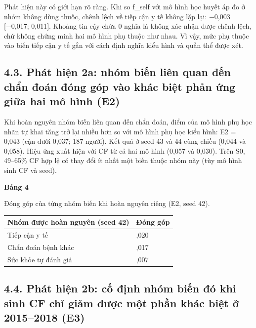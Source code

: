\documentclass[9pt,a4paper]{extarticle}
\newcommand{\tabcap}[2]{{\footnotesize\textbf{Bảng #1}\par\vspace{1pt}#2\par}\vspace{3pt}\scriptsize}
\newcommand{\tabnote}[1]{\par\vspace{2pt}{\scriptsize\raggedright #1\par}}
\begin{document}
Phát hiện này có giới hạn rõ ràng. Khi so f\_self với mô hình học huyết
áp đo ở nhóm không dùng thuốc, chênh lệch về tiếp cận y tế không lặp
lại: −0,003 {[}−0,017; 0,011{]}. Khoảng tin cậy chứa 0 nghĩa là không
xác nhận được chênh lệch, chứ không chứng minh hai mô hình phụ thuộc như
nhau. Vì vậy, mức phụ thuộc vào biến tiếp cận y tế gắn với cách định
nghĩa kiểu hình và quần thể được xét.

\subsection{4.3. Phát hiện 2a: nhóm biến liên quan đến chẩn đoán đóng
góp vào khác biệt phản ứng giữa hai mô hình (E2)}

Khi hoàn nguyên nhóm biến liên quan đến chẩn đoán, điểm của mô hình phụ
học nhãn tự khai tăng trở lại nhiều hơn so với mô hình phụ học kiểu
hình: E2 = 0,043 (cận dưới 0,037; 187 người). Kết quả ở seed 43 và 44
cùng chiều (0,044 và 0,058). Hiệu ứng xuất hiện với CF từ cả hai mô hình
(0,057 và 0,030). Trên S0, 49--65\% CF hợp lệ có thay đổi ít nhất một
biến thuộc nhóm này (tùy mô hình sinh CF và seed).

\begin{table}[!t]
\tabcap{4}{Đóng góp của từng nhóm biến khi hoàn nguyên riêng (E2, seed 42).}
\begin{tabularx}{\columnwidth}{>{\raggedright\arraybackslash}X>{\raggedright\arraybackslash}X}
\toprule
\textbf{Nhóm được hoàn nguyên (seed 42)} & \textbf{Đóng góp} \\ \midrule
Tiếp cận y tế & 0,020 \\
Chẩn đoán bệnh khác & 0,017 \\
Sức khỏe tự đánh giá & 0,007 \\
\bottomrule
\end{tabularx}
\tabnote{Đóng góp của các nhóm không cộng dồn được vì các biến tương tác với nhau. Thứ hạng ba nhóm thay đổi giữa các seed: tiếp cận y tế lớn nhất ở seed 42; SRH lớn nhất ở seed 43 (0,022); chẩn đoán bệnh khác lớn nhất ở seed 44 (0,031). Nhóm tiếp cận y tế đóng góp đáng kể ở cả ba seed nhưng không phải lúc nào cũng lớn nhất.}
\end{table}

\subsection{4.4. Phát hiện 2b: cố định nhóm biến đó khi sinh CF chỉ giảm
được một phần khác biệt ở 2015--2018 (E3)}
\end{document}
